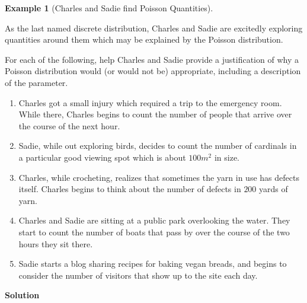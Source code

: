 \documentclass[
  letterpaper,
  DIV=11,
  numbers=noendperiod]{scrreprt}
\providecommand{\tightlist}{%
  \setlength{\itemsep}{0pt}\setlength{\parskip}{0pt}}\usepackage{longtable,booktabs,array}
\theoremstyle{definition}
\theoremstyle{definition}
\newtheorem{example}{Example}[chapter]
\theoremstyle{definition}
\theoremstyle{remark}
\begin{document}
\begin{example}[Charles and Sadie find Poisson
Quantities]\protect\hypertarget{exm-poi-dist-list}{}\label{exm-poi-dist-list}

As the last named discrete distribution, Charles and Sadie are excitedly
exploring quantities around them which may be explained by the Poisson
distribution.

For each of the following, help Charles and Sadie provide a
justification of why a Poisson distribution would (or would not be)
appropriate, including a description of the parameter.

\begin{enumerate}
\def\labelenumi{\alph{enumi}.}
\tightlist
\item
  Charles got a small injury which required a trip to the emergency
  room. While there, Charles begins to count the number of people that
  arrive over the course of the next hour.
\item
  Sadie, while out exploring birds, decides to count the number of
  cardinals in a particular good viewing spot which is about \(100m^2\)
  in size.
\item
  Charles, while crocheting, realizes that sometimes the yarn in use has
  defects itself. Charles begins to think about the number of defects in
  \(200\) yards of yarn.
\item
  Charles and Sadie are sitting at a public park overlooking the water.
  They start to count the number of boats that pass by over the course
  of the two hours they sit there.
\item
  Sadie starts a blog sharing recipes for baking vegan breads, and
  begins to consider the number of visitors that show up to the site
  each day.
\end{enumerate}

\begin{tcolorbox}[enhanced jigsaw, colback=white, colframe=quarto-callout-color-frame, arc=.35mm, leftrule=.75mm, rightrule=.15mm, opacityback=0, breakable, bottomrule=.15mm, left=2mm, toprule=.15mm]

\vspace{-3mm}\textbf{Solution}\vspace{3mm}


\end{tcolorbox}
\end{example}
\end{document}
